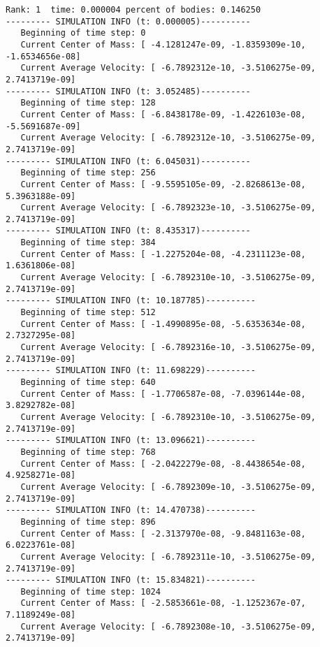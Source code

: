\documentclass[11pt]{article}
\begin{document}
\begin{verbatim}
Rank: 1  time: 0.000004 percent of bodies: 0.146250
--------- SIMULATION INFO (t: 0.000005)----------
   Beginning of time step: 0
   Current Center of Mass: [ -4.1281247e-09, -1.8359309e-10, -1.6534656e-08]
   Current Average Velocity: [ -6.7892312e-10, -3.5106275e-09, 2.7413719e-09]
--------- SIMULATION INFO (t: 3.052485)----------
   Beginning of time step: 128
   Current Center of Mass: [ -6.8438178e-09, -1.4226103e-08, -5.5691687e-09]
   Current Average Velocity: [ -6.7892312e-10, -3.5106275e-09, 2.7413719e-09]
--------- SIMULATION INFO (t: 6.045031)----------
   Beginning of time step: 256
   Current Center of Mass: [ -9.5595105e-09, -2.8268613e-08, 5.3963188e-09]
   Current Average Velocity: [ -6.7892323e-10, -3.5106275e-09, 2.7413719e-09]
--------- SIMULATION INFO (t: 8.435317)----------
   Beginning of time step: 384
   Current Center of Mass: [ -1.2275204e-08, -4.2311123e-08, 1.6361806e-08]
   Current Average Velocity: [ -6.7892310e-10, -3.5106275e-09, 2.7413719e-09]
--------- SIMULATION INFO (t: 10.187785)----------
   Beginning of time step: 512
   Current Center of Mass: [ -1.4990895e-08, -5.6353634e-08, 2.7327295e-08]
   Current Average Velocity: [ -6.7892316e-10, -3.5106275e-09, 2.7413719e-09]
--------- SIMULATION INFO (t: 11.698229)----------
   Beginning of time step: 640
   Current Center of Mass: [ -1.7706587e-08, -7.0396144e-08, 3.8292782e-08]
   Current Average Velocity: [ -6.7892310e-10, -3.5106275e-09, 2.7413719e-09]
--------- SIMULATION INFO (t: 13.096621)----------
   Beginning of time step: 768
   Current Center of Mass: [ -2.0422279e-08, -8.4438654e-08, 4.9258271e-08]
   Current Average Velocity: [ -6.7892309e-10, -3.5106275e-09, 2.7413719e-09]
--------- SIMULATION INFO (t: 14.470738)----------
   Beginning of time step: 896
   Current Center of Mass: [ -2.3137970e-08, -9.8481163e-08, 6.0223761e-08]
   Current Average Velocity: [ -6.7892311e-10, -3.5106275e-09, 2.7413719e-09]
--------- SIMULATION INFO (t: 15.834821)----------
   Beginning of time step: 1024
   Current Center of Mass: [ -2.5853661e-08, -1.1252367e-07, 7.1189249e-08]
   Current Average Velocity: [ -6.7892308e-10, -3.5106275e-09, 2.7413719e-09]


\end{verbatim}
\end{document}
